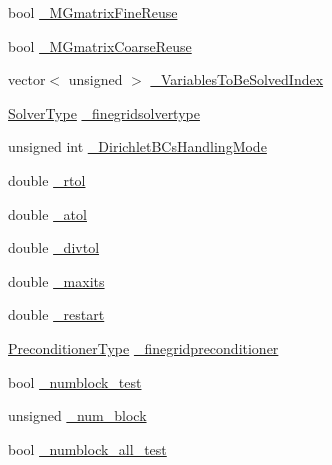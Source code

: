 \begin{DoxyCompactItemize}
\item 
bool \mbox{\hyperlink{classfemus_1_1_linear_implicit_system_aa871a5a088500632cbc57b2cc2b9ecb2}{\+\_\+\+M\+Gmatrix\+Fine\+Reuse}}
\item 
bool \mbox{\hyperlink{classfemus_1_1_linear_implicit_system_a47734db699c291150af6fa52af3151d8}{\+\_\+\+M\+Gmatrix\+Coarse\+Reuse}}
\item 
vector$<$ unsigned $>$ \mbox{\hyperlink{classfemus_1_1_linear_implicit_system_a571de4d32dfe814a3f95f22858021ed0}{\+\_\+\+Variables\+To\+Be\+Solved\+Index}}
\item 
\mbox{\hyperlink{_solvertype_enum_8hpp_a8b06041d7c1fb05f379714f4312306ec}{Solver\+Type}} \mbox{\hyperlink{classfemus_1_1_linear_implicit_system_aa797303b55f429b3125273a9e1503f63}{\+\_\+finegridsolvertype}}
\item 
unsigned int \mbox{\hyperlink{classfemus_1_1_linear_implicit_system_af18a5a7c9bd830ebb1684327dc59af90}{\+\_\+\+Dirichlet\+B\+Cs\+Handling\+Mode}}
\item 
double \mbox{\hyperlink{classfemus_1_1_linear_implicit_system_aa9b5ed6b2ab067f2e0b3745819da3079}{\+\_\+rtol}}
\item 
double \mbox{\hyperlink{classfemus_1_1_linear_implicit_system_a0707dbfda18d3e034c758cd97c22d16e}{\+\_\+atol}}
\item 
double \mbox{\hyperlink{classfemus_1_1_linear_implicit_system_a6362a11f66998a497573deaaf5eb706f}{\+\_\+divtol}}
\item 
double \mbox{\hyperlink{classfemus_1_1_linear_implicit_system_a0b8a51534dda2e293f41e6837879da1e}{\+\_\+maxits}}
\item 
double \mbox{\hyperlink{classfemus_1_1_linear_implicit_system_ac9a2c90ac22c3f93c8ded2bc2962a731}{\+\_\+restart}}
\item 
\mbox{\hyperlink{_precondtype_enum_8hpp_a8b341faac6531c4543c9dc6e5e4592cf}{Preconditioner\+Type}} \mbox{\hyperlink{classfemus_1_1_linear_implicit_system_a874dcd4b644518b819112ef05fcc936a}{\+\_\+finegridpreconditioner}}
\item 
bool \mbox{\hyperlink{classfemus_1_1_linear_implicit_system_a2f6b2ed9d871739b68b96b202e14a949}{\+\_\+numblock\+\_\+test}}
\item 
unsigned \mbox{\hyperlink{classfemus_1_1_linear_implicit_system_a91bdb9ac1c6e0d993e83ffa77370d13e}{\+\_\+num\+\_\+block}}
\item 
bool \mbox{\hyperlink{classfemus_1_1_linear_implicit_system_a4cec800383e85c8a1ace483c19f13414}{\+\_\+numblock\+\_\+all\+\_\+test}}
\item 

\end{DoxyCompactItemize}
